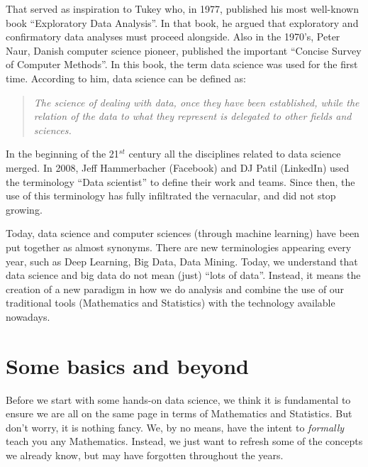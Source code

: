 \documentclass[10pt]{PhDthesisPSnPDF}%
\begin{document}
That served as inspiration to Tukey who, in 1977, published his most well-known book ``Exploratory Data Analysis''. In that book, he argued that exploratory and confirmatory data analyses must proceed alongside. Also in the 1970's, Peter Naur, Danish computer science pioneer, published the important ``Concise Survey of Computer Methods''. In this book, the term data science was used for the first time. According to him, data science can be defined as:
\begin{quotation}
\textit{The science of dealing with data, once they have been established, while the relation of the data to what they represent is delegated to other fields and sciences.}
\end{quotation} 

In the beginning of the 21$^{st}$ century all the disciplines related to data science merged. In 2008, Jeff Hammerbacher (Facebook) and DJ Patil (LinkedIn) used the terminology ``Data scientist'' to define their work and teams. Since then, the use of this terminology has fully infiltrated the vernacular, and did not stop growing. 

Today, data science and computer sciences (through machine learning) have been put together as almost synonyms. There are new terminologies appearing every year, such as Deep Learning, Big Data, Data Mining. Today, we understand that data science and big data do not mean (just) ``lots of data''. Instead, it means the creation of a new paradigm in how we do analysis and combine the use of our traditional tools (Mathematics and Statistics) with the technology available nowadays.

\chapter{Some basics and beyond}\label{basics}

Before we start with some hands-on data science, we think it is fundamental to ensure we are all on the same page in terms of Mathematics and Statistics. But don't worry, it is nothing fancy. We, by no means, have the intent to \textit{formally} teach you any Mathematics. Instead, we just want to refresh some of the concepts we already know, but may have forgotten throughout the years.
\end{document}
